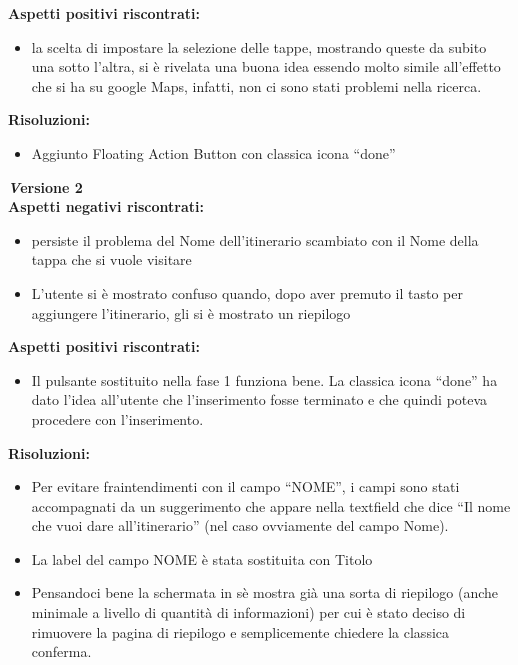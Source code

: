 \textbf{Aspetti positivi riscontrati:}
\begin{itemize}[label=-]

\item la scelta di impostare la selezione delle tappe, mostrando queste da subito
una sotto l’altra, si è rivelata una buona idea essendo molto simile all’effetto
che si ha su google Maps, infatti, non ci sono stati problemi nella ricerca.

\end{itemize}

\textbf{Risoluzioni:}
\begin{itemize}[label=-]

\item Aggiunto Floating Action Button con classica icona “done”

\end{itemize}

\textbf{\emph Versione 2}\\
\textbf{Aspetti negativi riscontrati:}
\begin{itemize}[label=-]

\item persiste il problema del Nome dell’itinerario scambiato con il Nome della
tappa che si vuole visitare
\item L’utente si è mostrato confuso quando, dopo aver premuto il tasto per aggiungere l’itinerario, gli si è mostrato un riepilogo

\end{itemize}

\textbf{Aspetti positivi riscontrati:}
\begin{itemize}[label=-]

\item Il pulsante sostituito nella fase 1 funziona bene. La classica icona “done” ha
dato l’idea all’utente che l’inserimento fosse terminato e che quindi poteva
procedere con l’inserimento.

\end{itemize}

\textbf{Risoluzioni:}
\begin{itemize}[label=-]
\item Per evitare fraintendimenti con il campo “NOME”, i campi sono stati accompagnati da
un suggerimento che appare nella textfield che dice “Il nome che vuoi dare
all’itinerario” (nel caso ovviamente del campo Nome).
\item La label del campo NOME è stata sostituita con Titolo
\item Pensandoci bene la schermata in sè mostra già una sorta di riepilogo (anche
minimale a livello di quantità di informazioni) per cui è stato deciso di rimuovere la
pagina di riepilogo e semplicemente chiedere la classica conferma.

\end{itemize}

